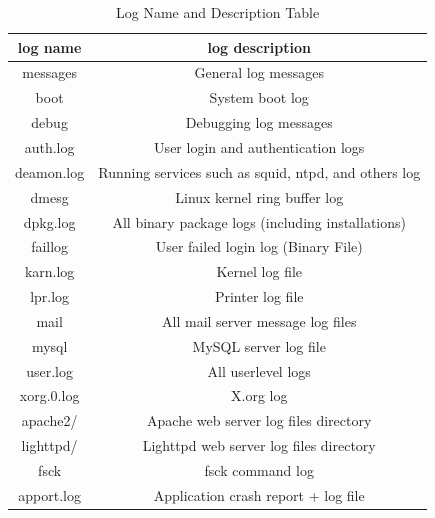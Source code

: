 \begin{table}
\centering
\begin{tabular}{cc}
\hline
log name & log description\\
\hline
messages & General log messages\\
boot & System boot log\\
debug & Debugging log messages\\
auth.log & User login and authentication logs\\
deamon.log & Running services such as squid, ntpd, and others log\\
dmesg & Linux kernel ring buffer log\\
dpkg.log & All binary package logs (including installations)\\
faillog & User failed login log (Binary File)\\
karn.log & Kernel log file\\
lpr.log & Printer log file\\
mail & All mail server message log files\\
mysql & MySQL server log file\\
user.log & All userlevel logs\\
xorg.0.log & X.org log\\
apache2/ & Apache web server log files directory\\
lighttpd/ & Lighttpd web server log files directory\\
fsck & fsck command log\\
apport.log & Application crash report + log file\\
\hline
\end{tabular}
\caption{Log Name and Description Table}
\label{tab:logTable}
\end{table}